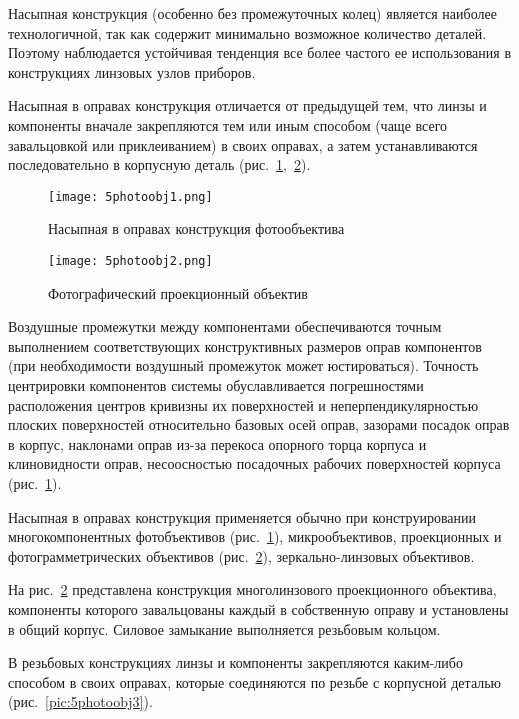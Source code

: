 Насыпная конструкция (особенно без промежуточных колец) является наиболее технологичной, так как содержит минимально возможное количество деталей. Поэтому наблюдается устойчивая тенденция все более частого ее использования в конструкциях линзовых узлов приборов.

Насыпная в оправах конструкция отличается от предыдущей тем, что линзы и компоненты вначале закрепляются тем или иным способом (чаще всего завальцовкой или приклеиванием) в своих оправах, а затем устанавливаются последовательно в корпусную деталь (рис.~\ref{pic:5photoobj1},~\ref{pic:5photoobj2}).

\begin{figure}[h!]
	\caption{ Насыпная в оправах конструкция фотообъектива }
	\texttt{[image: 5photoobj1.png]}
	\label{pic:5photoobj1}
\end{figure}

\begin{figure}[h!]
	\caption{ Фотографический проекционный объектив }
	\texttt{[image: 5photoobj2.png]}
	\label{pic:5photoobj2}
\end{figure}

Воздушные промежутки между компонентами обеспечиваются точным выполнением соответствующих конструктивных размеров оправ компонентов (при необходимости воздушный промежуток может юстироваться). Точность центрировки компонентов системы обуславливается погрешностями расположения центров кривизны их поверхностей и неперпендикулярностью плоских поверхностей относительно базовых осей оправ, зазорами посадок оправ в корпус, наклонами оправ из-за перекоса опорного торца корпуса и клиновидности оправ, несоосностью посадочных рабочих поверхностей корпуса (рис.~\ref{pic:5photoobj1}).

Насыпная в оправах конструкция применяется обычно при конструировании многокомпонентных фотобъективов (рис.~\ref{pic:5photoobj1}), микрообъективов, проекционных и фотограмметрических объективов (рис.~\ref{pic:5photoobj2}), зеркально-линзовых объективов.

На рис.~\ref{pic:5photoobj2} представлена конструкция многолинзового проекционного объектива, компоненты которого завальцованы каждый в собственную оправу и установлены в общий корпус. Силовое замыкание выполняется резьбовым кольцом.

В резьбовых конструкциях линзы и компоненты закрепляются каким-либо способом в своих оправах, которые соединяются по резьбе с корпусной деталью (рис.~\ref{pic:5photoobj3}).

